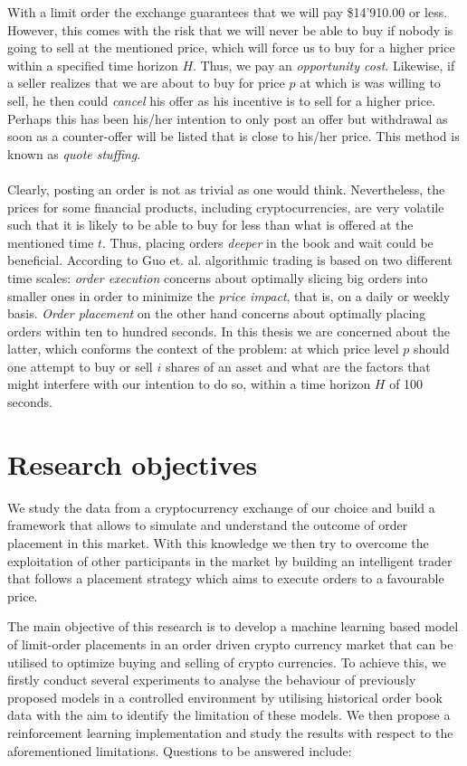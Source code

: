 With a limit order the exchange guarantees that we will pay \$14'910.00 or less.
However, this comes with the risk that we will never be able to buy if nobody is going to sell at the mentioned price, which will force us to buy for a higher price within a specified time horizon $H$.
Thus, we pay an \textit{opportunity cost}.
Likewise, if a seller realizes that we are about to buy for price $p$ at which is was willing to sell, he then could \textit{cancel} his offer as his incentive is to sell for a higher price.
Perhaps this has been his/her intention to only post an offer but withdrawal as soon as a counter-offer will be listed that is close to his/her price.
This method is known as \textit{quote stuffing}.
\\
\\
Clearly, posting an order is not as trivial as one would think.
Nevertheless, the prices for some financial products, including cryptocurrencies, are very volatile such that it is likely to be able to buy for less than what is offered at the mentioned time $t$.
Thus, placing orders \textit{deeper} in the book and wait could be beneficial.
According to Guo et. al. \cite{guo2013optimal} algorithmic trading is based on two different time scales: \textit{order execution} concerns about optimally slicing big orders into smaller ones in order to minimize the \textit{price impact}, that is, on a daily or weekly basis.
\textit{Order placement} on the other hand concerns about optimally placing orders within ten to hundred seconds. 
In this thesis we are concerned about the latter, which conforms the context of the problem: at which price level $p$ should one attempt to buy or sell $i$ shares of an asset and what are the factors that might interfere with our intention to do so, within a time horizon $H$ of 100 seconds.

\section{Research objectives}

We study the data from a cryptocurrency exchange of our choice and build a framework that allows to simulate and understand the outcome of order placement in this market.
With this knowledge we then try to overcome the exploitation of other participants in the market by building an intelligent trader that follows a placement strategy which aims to execute orders to a favourable price.

The main objective of this research is to develop a machine learning based model of limit-order placements in an order driven crypto currency market that can be utilised to optimize buying and selling of crypto currencies. To achieve this, we firstly conduct several experiments to analyse the behaviour of previously proposed models in a controlled environment by utilising historical order book data with the aim to identify the limitation of these models. We then propose a reinforcement learning implementation and study the results with respect to the aforementioned limitations. Questions to be answered include:

